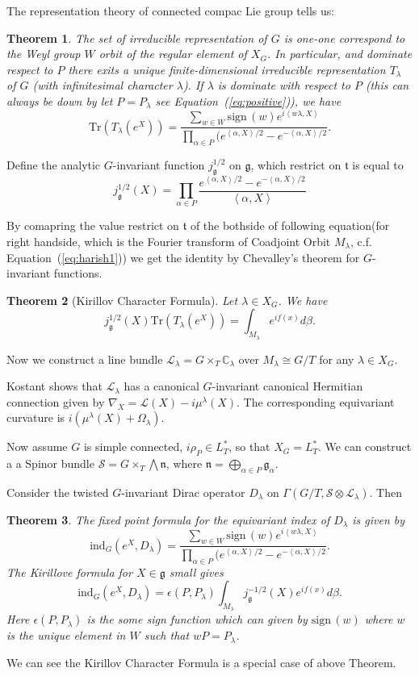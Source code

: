 \documentclass[11pt]{amsart}
\newtheorem{Thm}{Theorem}
\def\cL{{\mathcal{L}}}
\def\cS{{\mathcal{S}}}
\def\bC{{\mathbb{C}}}
\def\fgg{{\mathfrak{g}}}
\def\ftt{{\mathfrak{t}}}
\def\fnn{{\mathfrak{n}}}
\def\inn#1#2{\left<{#1},{#2}\right>}
\def\sign{\mathrm{sign\,}}
\def\ind{\mathrm{ind}}
\def\Tr{\mathrm{Tr}}
\begin{document}
The representation theory of connected compac Lie group tells us:
\begin{Thm}
The set of irreducible representation of $G$ is one-one correspond to 
the Weyl group $W$ orbit of the regular element of $X_G$.
In particular, 
and dominate respect to $P$ there exits a unique 
finite-dimensional irreducible representation $T_\lambda$ of $G$
(with infinitesimal character $\lambda$).
If $\lambda$ is dominate with respect to $P$ (this can always be down by let
$P=P_\lambda$ see Equation~(\ref{eq:positive})), we have 
\[
\Tr(T_\lambda(e^X)) = \frac{\sum_{w\in W}\sign(w)e^{i\inn{w\lambda}{X}}}{
\prod_{\alpha\in P}(e^{\inn{\alpha}{X}/2} - e^{-\inn{\alpha}{X}/2} }.
\] 
\end{Thm}

Define the analytic $G$-invariant function $j_\fgg^{1/2}$ on $\fgg$, 
which restrict on $\ftt$ is equal to 
\[
j_\fgg^{1/2} (X) 
= \prod_{\alpha\in P}\frac{e^{\inn{\alpha}{X}/2} - e^{-\inn{\alpha}{X}/2}}{\inn{\alpha}{X}}
\]

By comapring the value restrict on $\ftt$ of the bothside of following 
equation(for right handside, which is the Fourier transform of Coadjoint Orbit
$M_\lambda$, c.f. Equation~(\ref{eq:harish1}))
we get the identity by Chevalley's theorem 
for $G$-invariant functions.
\begin{Thm}[Kirillov Character Formula]
Let $\lambda\in X_G$. We have
\[
j_\fgg^{1/2}(X) \Tr(T_\lambda(e^X)) = \int_{M_\lambda}e^{if(x)} d\beta.
\] 
\end{Thm} 

Now we construct a line bundle $\cL_\lambda = G\times_T\bC_\lambda$ over
$M_\lambda \cong G/T$ for any $\lambda\in X_G$.

Kostant shows that $\cL_\lambda$ has a canonical $G$-invariant canonical 
Hermitian connection given by $\nabla_X = \cL(X) - i\mu^\lambda(X)$.
The corresponding equivariant curvature is $i(\mu^\lambda(X)+\Omega_\lambda)$.

Now assume $G$ is simple connected, $i\rho_P\in L^*_T$, so that $X_G = L_T^*$.
We can construct a a Spinor bundle $\cS = G\times_T\bigwedge \fnn$, where 
$\fnn = \bigoplus_{\alpha\in P} \fgg_\alpha$. %

Consider the twisted $G$-invariant Dirac operator 
$D_\lambda$ on $\Gamma(G/T,\cS\otimes \cL_\lambda)$.
Then
\begin{Thm}
The fixed point formula for the equivariant index of $D_\lambda$ is given by 
\[
\ind_G(e^X, D_\lambda) =  \frac{\sum_{w\in W}\sign(w)e^{i\inn{w\lambda}{X}}}{
\prod_{\alpha\in P}(e^{\inn{\alpha}{X}/2} - e^{-\inn{\alpha}{X}/2} }.
\]
The Kirillove formula for $X\in \fgg$ small gives 
\[
\ind_G(e^X, D_\lambda) = \epsilon(P,P_\lambda)\int_{M_\lambda} j_\fgg^{-1/2}(X)
e^{if(x)} d\beta.
\] 
Here $\epsilon(P,P_\lambda)$ is the some sign function which can given by 
$\sign(w)$ where $w$ is the unique element in $W$ such that $wP = P_\lambda$.
\end{Thm}
 We can see the Kirillov Character Formula is a special case of above Theorem.
\end{document}
